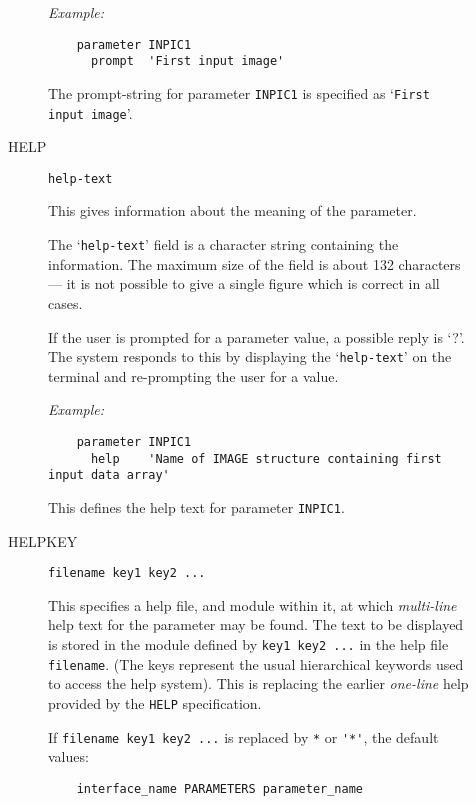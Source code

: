 \begin{description}
\begin{description}
{\em Example:}

\begin{small}
\begin{verbatim}
    parameter INPIC1
      prompt  'First input image'
\end{verbatim}
\end{small}

The prompt-string for parameter \verb+INPIC1+ is specified as
`\verb+First input image+'.

\item [HELP] {\tt help-text}

This gives information about the meaning of the parameter.

The `\verb+help-text+' field is a character string containing the information.
The maximum size of the field is about 132 characters --- it is not possible
to give a single figure which is correct in all cases.

If the user is prompted for a parameter value, a possible reply is `?'.
The system responds to this by displaying the `\verb+help-text+' on the
terminal and re-prompting the user for a value.

{\em Example:}

\begin{small}
\begin{verbatim}
    parameter INPIC1
      help    'Name of IMAGE structure containing first input data array'
\end{verbatim}
\end{small}

This defines the help text for parameter \verb+INPIC1+.

\item [HELPKEY] {\tt filename key1 key2 ...}

This specifies a help file, and module within it, at which {\em multi-line}
help text for the parameter may be found.
The text to be displayed is stored in the module defined by
\verb+key1 key2 ...+ in the help file \verb+filename+.
(The keys represent the usual hierarchical keywords used to access the help
system).
This is replacing the earlier {\em one-line} help provided by the \verb+HELP+
specification.

If \verb+filename key1 key2 ...+ is replaced by \verb+*+ or \verb+'*'+, the
default values:

\begin{small}
\begin{verbatim}
    interface_name PARAMETERS parameter_name
\end{verbatim}
\end{small}


\end{description}
\end{description}
